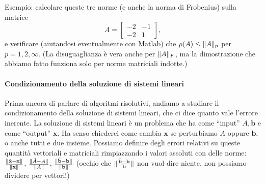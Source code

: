 \documentclass[a4paper]{report}
\DeclarePairedDelimiter{\norm}{\lVert}{\rVert}
\theoremstyle{definition}
\theoremstyle{remark}
\newcommand{\x}{\mathbf{x}}
\renewcommand{\b}{\mathbf{b}}
\begin{document}
Esempio: calcolare queste tre norme (e anche la norma di Frobenius) sulla matrice
\[
A = \begin{bmatrix}
    -2 & -1\\
    -2 & 1
\end{bmatrix},
\]
e verificare (aiutandosi eventualmente con Matlab) che $\rho(A)\leq \norm{A}_p$ per $p=1,2,\infty$. (La disuguaglianza è vera anche per $\norm{A}_F$, ma la dimostrazione che abbiamo fatto funziona solo per norme matriciali indotte.)



\paragraph{Condizionamento della soluzione di sistemi lineari} Prima ancora di parlare di algoritmi risolutivi, andiamo a studiare il condizionamento della soluzione di sistemi lineari, che ci dice quanto vale l'errore inerente. La soluzione di sistemi lineari è un problema che ha come ``input'' $A,\b$ e come ``output'' $\x$. Ha senso chiederci come cambia $\x$ se perturbiamo $A$ oppure $\b$, o anche tutti e due insieme. Possiamo definire degli errori relativi su queste quantità vettoriali e matriciali rimpiazzando i valori assoluti con delle norme: $\frac{\norm{\tilde{\x}-\x}}{\norm{\x}}$, $\frac{\norm{\tilde{A}-A}}{\norm{A}}$, $\frac{\norm{\tilde{\b}-\b}}{\norm{\b}}$ (occhio che $\norm{\frac{\tilde{\b}-\b}{\b}}$ non vuol dire niente, non possiamo dividere per vettori!)
\end{document}
